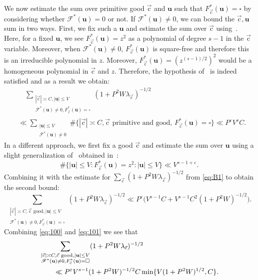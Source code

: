\documentclass[letterpaper,11pt]{amsart}
\numberwithin{equation}{section}
\theoremstyle{definition}
\numberwithin{equation}{section}
\newcommand{\uu}{\mathbf{u}}
\newcommand{\uc}{{\vec{\mathrm{c}}}}
\def\scrF{{\mathcal F}}
\newcommand{\ve}{\varepsilon}
\begin{document}
We now estimate the sum over primitive good $\uc$ and $\uu$ such that $F_\uc^*(\uu)=\square$ by considering whether $\mathcal F^*(\uu)=0$ or not. If $\mathcal F^*(\uu)\not=0$, we can bound the $\uc, \uu$ sum in two ways. First, we fix such a $\uu$ and estimate the sum over $\uc$ using~\cite[Theorem 5]{Bro_03}. Here, for a fixed $\uu$, we see $F_\uc^*(\uu)=z^2$ as a polynomial of degree $s-1$ in the $\uc$ variable. Moreover, when $\scrF^*(\uu)\neq 0$, $F_\uc^*(\uu)$ is square-free and therefore this is an irreducible polynomial in $z$. Moreover, $F_\uc^*(\uu)=(z^{(s-1)/2})^2$ would be a homogeneous polynomial in $\uc$ and $z$. Therefore, the hypothesis of~\cite[Theorem 5]{Bro_03} is indeed satisfied and as a result we obtain:
\begin{align}\label{eq:100}
&\quad \sum_{\substack{|\uc|\asymp C, |\uu|\leq V\\ \scrF^*(\uu)\neq 0, F_\uc^*(\uu)=\square }}(1+P^2W\lambda_{\uc})^{-1/2}\\ &\ll \sum_{\substack{|\uu|\leq V\\ \scrF^*(\uu)\neq 0}}\#\{|\uc|
\asymp C, \uc\textrm{ primitive and good, } F_\uc^*(\uu)=\square\}\ll P^{\ve} V^s C.\nonumber
\end{align}
In a different approach, we first fix a good $\uc$ and estimate the sum over $\uu$ using a slight generalization of~\cite[Theorem 2]{HeathBrown02} obtained in~\cite[Lemma 3.7]{V19}:
\begin{equation}\label{eq:more-counting}
\#\{|\uu|\leq V: F_\uc^*(\uu)=z^2:|\uu|\leq V \}\ll  V^{s-1+\ve}.
\end{equation}
Combining it with the estimate for $\sum_\uc (1+P^2W\lambda_\uc)^{-1/2} $ from \eqref{eq:B1} to obtain the second bound:
\begin{equation}\label{eq:101}
\sum_{\substack{|\uc|\asymp C, \uc \text{ good},  |\uu|\leq V\\ \scrF^*(\uu)\neq 0, F_\uc^*(\uu)=\square }}(1+P^2W\lambda_{\uc})^{-1/2}\ll P^\ve\Big( V^{s-1}C+V^{s-1}C^2(1+P^2W)^{-1/2}\Big).
\end{equation}
Combining \eqref{eq:100} and \eqref{eq:101} we see that 
\begin{align}\nonumber
\MoveEqLeft \sum_{\substack{|\uc|\asymp C, \uc \text{ good},   |\uu|\leq V\\ \scrF^*(\uu)\neq 0, F_\uc^*(\uu)=\square }}(1+P^2W\lambda_{\uc})^{-1/2} 
\\ &\ll P^{\ve} V^{s-1}(1+P^2W)^{-1/2}C \min\{V(1+P^2W)^{1/2},C\}.\label{eq:1001}
\end{align}
\end{document}
